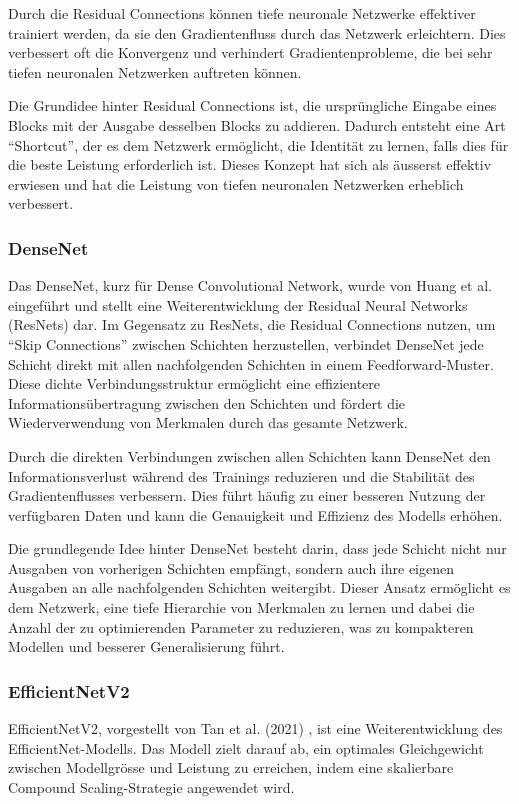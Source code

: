 Durch die Residual Connections können tiefe neuronale Netzwerke effektiver trainiert werden, da sie den Gradientenfluss durch das Netzwerk erleichtern. Dies verbessert oft die Konvergenz und verhindert Gradientenprobleme, die bei sehr tiefen neuronalen Netzwerken auftreten können.

Die Grundidee hinter Residual Connections ist, die ursprüngliche Eingabe eines Blocks mit der Ausgabe desselben Blocks zu addieren. Dadurch entsteht eine Art "`Shortcut"', der es dem Netzwerk ermöglicht, die Identität zu lernen, falls dies für die beste Leistung erforderlich ist. Dieses Konzept hat sich als äusserst effektiv erwiesen und hat die Leistung von tiefen neuronalen Netzwerken erheblich verbessert.

\subsubsection{DenseNet}
Das DenseNet, kurz für Dense Convolutional Network, wurde von Huang et al. \cite{huang_densely_2018} eingeführt und stellt eine Weiterentwicklung der Residual Neural Networks (ResNets) dar. Im Gegensatz zu ResNets, die Residual Connections nutzen, um "`Skip Connections"' zwischen Schichten herzustellen, verbindet DenseNet jede Schicht direkt mit allen nachfolgenden Schichten in einem Feedforward-Muster. Diese dichte Verbindungsstruktur ermöglicht eine effizientere Informationsübertragung zwischen den Schichten und fördert die Wiederverwendung von Merkmalen durch das gesamte Netzwerk.

Durch die direkten Verbindungen zwischen allen Schichten kann DenseNet den Informationsverlust während des Trainings reduzieren und die Stabilität des Gradientenflusses verbessern. Dies führt häufig zu einer besseren Nutzung der verfügbaren Daten und kann die Genauigkeit und Effizienz des Modells erhöhen.

Die grundlegende Idee hinter DenseNet besteht darin, dass jede Schicht nicht nur Ausgaben von vorherigen Schichten empfängt, sondern auch ihre eigenen Ausgaben an alle nachfolgenden Schichten weitergibt. Dieser Ansatz ermöglicht es dem Netzwerk, eine tiefe Hierarchie von Merkmalen zu lernen und dabei die Anzahl der zu optimierenden Parameter zu reduzieren, was zu kompakteren Modellen und besserer Generalisierung führt.

\subsubsection{EfficientNetV2}
EfficientNetV2, vorgestellt von Tan et al. (2021) \cite{tan_efficientnetv2_2021}, ist eine Weiterentwicklung des EfficientNet-Modells. Das Modell zielt darauf ab, ein optimales Gleichgewicht zwischen Modellgrösse und Leistung zu erreichen, indem eine skalierbare Compound Scaling-Strategie angewendet wird.


